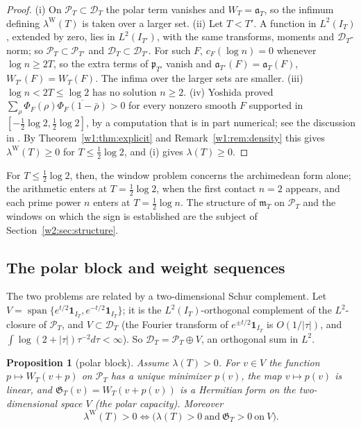 \documentclass[11pt]{amsart}
\newtheorem{proposition}[theorem]{Proposition}
\theoremstyle{definition}
\theoremstyle{remark}
\numberwithin{equation}{section}
\DeclareMathOperator{\spn}{span}
\newcommand{\IT}{I_T}                                  %
\newcommand{\cF}{c_F}                                  %
\newcommand{\PhiF}{\Phi_F}                             %
\newcommand{\PT}{\mathcal{P}_T}                        %
\newcommand{\DT}{\mathcal{D}_T}                        %
\newcommand{\mT}{\mathfrak{m}_T}                       %
\newcommand{\aT}{\mathfrak{a}_T}                       %
\newcommand{\WT}{W_T}                                  %
\newcommand{\lam}{\lambda(T)}                          %
\newcommand{\lamW}{\lambda^{\mathrm W}(T)}             %
\begin{document}
\begin{proof}
(i) On $\PT\subset\DT$ the polar term vanishes and $\WT=\aT$, so the infimum
defining $\lamW$ is taken over a larger set.
(ii) Let $T<T'$. A function in $L^2(\IT)$, extended by zero, lies in
$L^2(I_{T'})$, with the same transforms, moments and $\DT$-norm; so
$\PT\subset\mathcal P_{T'}$ and $\DT\subset\mathcal D_{T'}$. For such $F$,
$\cF(\log n)=0$ whenever $\log n\ge2T$, so the extra terms of
$\mathfrak p_{T'}$ vanish and $\mathfrak a_{T'}(F)=\aT(F)$,
$W_{T'}(F)=\WT(F)$. The infima over the larger sets are smaller.
(iii) $\log n<2T\le\log 2$ has no solution $n\ge2$.
(iv) Yoshida \cite[Theorem~1]{Yoshida1992} proved
$\sum_\rho\PhiF(\rho)\overline{\PhiF(1-\bar\rho)}>0$ for every nonzero smooth
$F$ supported in $[-\frac12\log2,\frac12\log2]$, by a computation that is in
part numerical; see the discussion in \cite[Remark~6.3]{P45}. By
Theorem~\ref{w1:thm:explicit} and Remark~\ref{w1:rem:density} this gives
$\lamW\ge0$ for $T\le\frac12\log2$, and (i) gives $\lam\ge0$.
\end{proof}

For $T\le\frac12\log 2$, then, the window problem concerns the archimedean
form alone; the arithmetic enters at $T=\frac12\log2$, when the first contact
$n=2$ appears, and each prime power $n$ enters at $T=\frac12\log n$. The
structure of $\mT$ on $\PT$ and the windows on which the sign is established
are the subject of Section~\ref{w2:sec:structure}.

\subsection{The polar block and weight sequences}\label{w1:subsec:weights}
The two problems are related by a two-dimensional Schur complement. Let
$V=\spn\{e^{t/2}\mathbf 1_{\IT},e^{-t/2}\mathbf 1_{\IT}\}$; it is the
$L^2(\IT)$-orthogonal complement of the $L^2$-closure of $\PT$, and $V\subset\DT$
(the Fourier transform of $e^{\pm t/2}\mathbf 1_{\IT}$ is $O(1/|\tau|)$, and
$\int\log(2+|\tau|)\tau^{-2}d\tau<\infty$). So $\DT=\PT\oplus V$, an
orthogonal sum in $L^2$.

\begin{proposition}[polar block]\label{w1:prop:polar}
Assume $\lam>0$. For $v\in V$ the function $p\mapsto\WT(v+p)$ on $\PT$ has a
unique minimizer $p(v)$, the map $v\mapsto p(v)$ is linear, and
$\mathfrak G_T(v)=\WT(v+p(v))$ is a Hermitian form on the two-dimensional
space $V$ (the \emph{polar capacity}). Moreover
\[
  \lamW>0\iff\bigl(\lam>0\ \text{and}\ \mathfrak G_T>0\ \text{on}\ V\bigr).
\]
\end{proposition}
\end{document}
